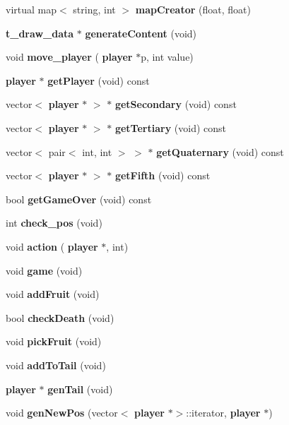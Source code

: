 \begin{DoxyCompactItemize}
\item 
\mbox{\label{class_snake_a7b81421e0c7eedf3a7404943d46b616b}} 
virtual map$<$ string, int $>$ {\bfseries map\+Creator} (float, float)
\item 
\mbox{\label{class_snake_a87c85cbe4793ed56e7dc278bce3f3ca0}} 
\textbf{ t\+\_\+draw\+\_\+data} $\ast$ {\bfseries generate\+Content} (void)
\item 
\mbox{\label{class_snake_ac0be7c8da71c7a4502e126e160660a4c}} 
void {\bfseries move\+\_\+player} (\textbf{ player} $\ast$p, int value)
\item 
\mbox{\label{class_snake_a5d5e576f96e28c3e2f3ac60e4d7cf292}} 
\textbf{ player} $\ast$ {\bfseries get\+Player} (void) const
\item 
\mbox{\label{class_snake_a738ac832860df6e3c54fb77cca92e72f}} 
vector$<$ \textbf{ player} $\ast$ $>$ $\ast$ {\bfseries get\+Secondary} (void) const
\item 
\mbox{\label{class_snake_ad8cd4a0377053234f7673f95d6902846}} 
vector$<$ \textbf{ player} $\ast$ $>$ $\ast$ {\bfseries get\+Tertiary} (void) const
\item 
\mbox{\label{class_snake_a2ace77187281c86681fcfca44bf0c7ad}} 
vector$<$ pair$<$ int, int $>$ $>$ $\ast$ {\bfseries get\+Quaternary} (void) const
\item 
\mbox{\label{class_snake_a280b8abdd1156836a1daa00ff6b627e6}} 
vector$<$ \textbf{ player} $\ast$ $>$ $\ast$ {\bfseries get\+Fifth} (void) const
\item 
\mbox{\label{class_snake_ac9d799ff927618a484da4ae14df67ef9}} 
bool {\bfseries get\+Game\+Over} (void) const
\item 
\mbox{\label{class_snake_a31f2fe1bb2175260f2ebb3d2db40a9a7}} 
int {\bfseries check\+\_\+pos} (void)
\item 
\mbox{\label{class_snake_ad10570520301d6d7594d91223996f8d3}} 
void {\bfseries action} (\textbf{ player} $\ast$, int)
\item 
\mbox{\label{class_snake_abe8f046cfd2c717eda99e5c6d7bdcc03}} 
void {\bfseries game} (void)
\item 
\mbox{\label{class_snake_abccbcd3ed8ba522a87c9e429af69e75b}} 
void {\bfseries add\+Fruit} (void)
\item 
\mbox{\label{class_snake_af7ab67615280f5fcfa3153f328717eb4}} 
bool {\bfseries check\+Death} (void)
\item 
\mbox{\label{class_snake_a7bb21a0b691871dffa34adc58d8e6ff0}} 
void {\bfseries pick\+Fruit} (void)
\item 
\mbox{\label{class_snake_ad89cdeb548e6191d760acda1d999c89a}} 
void {\bfseries add\+To\+Tail} (void)
\item 
\mbox{\label{class_snake_a71f06eacde8333272f5042c26b605a11}} 
\textbf{ player} $\ast$ {\bfseries gen\+Tail} (void)
\item 
\mbox{\label{class_snake_a2a47c8ad4c1b45e94afad819d0531752}} 
void {\bfseries gen\+New\+Pos} (vector$<$ \textbf{ player} $\ast$$>$\+::iterator, \textbf{ player} $\ast$)
\end{DoxyCompactItemize}
